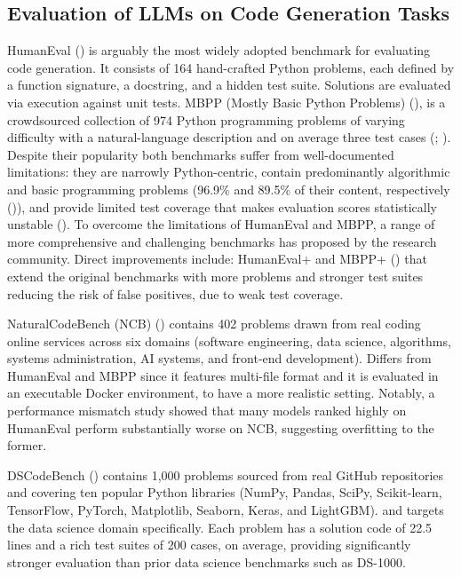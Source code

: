 \documentclass[mscthesis]{usiinfthesis}
\begin{document}
\subsection{Evaluation of LLMs on Code Generation Tasks}
HumanEval (\citet{DBLP:journals/corr/abs-2107-03374}) is arguably the most widely adopted benchmark for evaluating code generation. It consists of 164 hand-crafted Python problems, each defined by a function signature, a docstring, and a hidden test suite. Solutions are evaluated via execution against unit tests. MBPP (Mostly Basic Python Problems) (\citet{austin2021programsynthesislargelanguage}), is a crowdsourced collection of 974 Python programming problems of varying difficulty with a natural-language description and on average three test cases (\citet{ouyang2025dscodebenchrealisticbenchmarkdata}; \citet{koohestani2025benchmarkingaimodelssoftware}). Despite their popularity both benchmarks suffer from well-documented limitations: they are narrowly Python-centric, contain predominantly algorithmic and basic programming problems (96.9\% and 89.5\% of their content, respectively  (\citet{zhang2024naturalcodebenchexaminingcodingperformance})), and provide limited test coverage that makes evaluation scores statistically unstable (\citet{koohestani2025benchmarkingaimodelssoftware}).
To overcome the limitations of HumanEval and MBPP, a range of more comprehensive and challenging benchmarks has proposed by the research community. Direct improvements include: HumanEval+ and MBPP+ (\citet{liu2023codegeneratedchatgptreally}) that extend the original benchmarks with more problems and stronger test suites reducing the risk of false positives, due to weak test coverage.
\par\vspace{1em}
NaturalCodeBench (NCB) (\citet{zhang2024naturalcodebenchexaminingcodingperformance}) contains 402 problems drawn from real coding online services across six domains (software engineering, data science, algorithms, systems administration, AI systems, and front-end development).
Differs from HumanEval and MBPP since it features multi-file format and it is evaluated in an executable Docker environment, to have a more realistic setting.
Notably, a performance mismatch study showed that many models ranked highly on HumanEval perform substantially worse on NCB, suggesting overfitting to the former.
\par\vspace{1em}
DSCodeBench (\citet{ouyang2025dscodebenchrealisticbenchmarkdata}) contains 1,000 problems sourced from real GitHub repositories and covering ten popular Python libraries (NumPy, Pandas, SciPy, Scikit-learn, TensorFlow, PyTorch, Matplotlib, Seaborn, Keras, and LightGBM). and targets the data science domain specifically. Each problem has a solution code of 22.5 lines and a rich test suites of 200 cases, on average, providing significantly stronger evaluation than prior data science benchmarks such as DS-1000.
\end{document}
